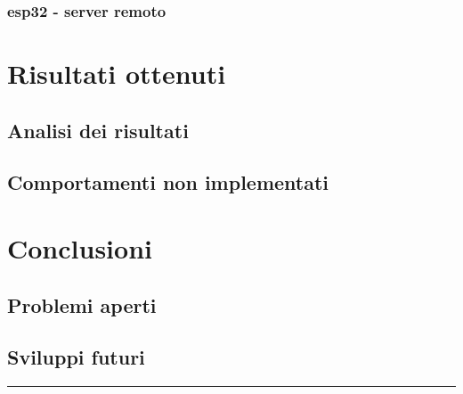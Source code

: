 \documentclass[12pt,a4paper]{report}
\begin{document}
\subsection{esp32 - server remoto}

\chapter{Risultati ottenuti}
\section{Analisi dei risultati}
\section{Comportamenti non implementati}
\chapter{Conclusioni}
\section{Problemi aperti}
\section{Sviluppi futuri}


\hrule
%
\printbibliography[title={Bibliografia}]
\end{document}
